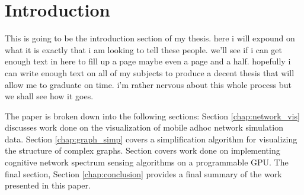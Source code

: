 \chapter{Introduction}
This is going to be the introduction section of my thesis.  here i will expound on what it is exactly that i am looking to tell these people.  we'll see if i can get enough text in here to fill up a page maybe even a page and a half.  hopefully i can write enough text on all of my subjects to produce a decent thesis that will allow me to graduate on time.  i'm rather nervous about this whole process but we shall see how it goes.

The paper is broken down into the following sections:  Section \ref{chap:network_vis} discusses work done on the visualization of mobile adhoc network simulation data.  Section \ref{chap:graph_simp} covers a simplification algorithm for visualizing the structure of complex graphs.  Section  covers work done on implementing cognitive network spectrum sensing algorithms on a programmable GPU.  The final section, Section \ref{chap:conclusion} provides a final summary of the work presented in this paper.
